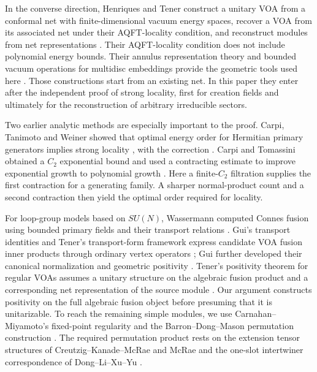 \documentclass[11pt]{article}
\numberwithin{equation}{section}
\theoremstyle{definition}
\theoremstyle{remark}
\begin{document}
In the converse direction, Henriques and Tener construct a unitary VOA from a conformal net with finite-dimensional vacuum energy spaces, recover a VOA from its associated net under their AQFT-locality condition, and reconstruct modules from net representations \cite[Theorems~A--C and~8.9]{HTVOA}. Their AQFT-locality condition does not include polynomial energy bounds. Their annulus representation theory and bounded vacuum operations for multidisc embeddings provide the geometric tools used here \cite{HTVirasoro,HTGenusZero}. Those constructions start from an existing net. In this paper they enter after the independent proof of strong locality, first for creation fields and ultimately for the reconstruction of arbitrary irreducible sectors.

Two earlier analytic methods are especially important to the proof. Carpi, Tanimoto and Weiner showed that optimal energy order for Hermitian primary generators implies strong locality \cite[Theorem~3.7]{CTW}, with the correction \cite{CTWCorrection}. Carpi and Tomassini obtained a $C_2$ exponential bound and used a contracting estimate to improve exponential growth to polynomial growth \cite[Proposition~3.17 and Theorem~4.5]{CarpiTomassini}. Here a finite-$C_2$ filtration supplies the first contraction for a generating family. A sharper normal-product count and a second contraction then yield the optimal order required for locality.

For loop-group models based on $SU(N)$, Wassermann computed Connes fusion using bounded primary fields and their transport relations \cite{Wassermann}. Gui's transport identities and Tener's transport-form framework express candidate VOA fusion inner products through ordinary vertex operators \cite{GuiUnitaryII,TenerFusion}; Gui further developed their canonical normalization and geometric positivity \cite{GuiPositivity}. Tener's positivity theorem for regular VOAs assumes a unitary structure on the algebraic fusion product and a corresponding net representation of the source module \cite[Theorem~4.4]{TenerFusion}. Our argument constructs positivity on the full algebraic fusion object before presuming that it is unitarizable. To reach the remaining simple modules, we use Carnahan--Miyamoto's fixed-point regularity and the Barron--Dong--Mason permutation construction \cite{CarnahanMiyamoto,BDM}. The required permutation product rests on the extension tensor structures of Creutzig--Kanade--McRae and McRae \cite{CKMExtensions,McRaeTwisted} and the one-slot intertwiner correspondence of Dong--Li--Xu--Yu \cite[Theorems~5.5 and~5.9]{DLXY}.
\end{document}
